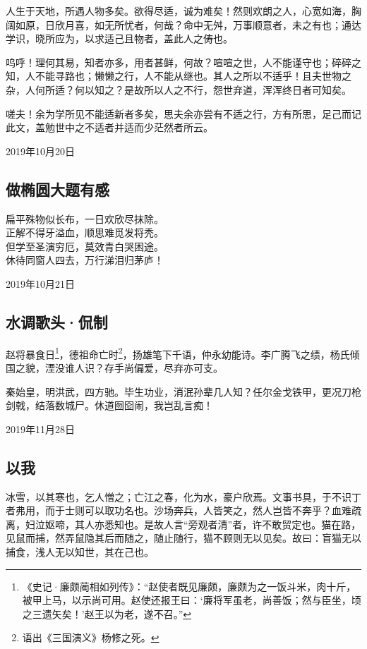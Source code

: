 \documentclass[a5paper]{ctexart}
\begin{document}
	人生于天地，所遇人物多矣。欲得尽适，诚为难矣！然则欢朗之人，心宽如海，胸阔如原，日欣月喜，如无所忧者，何哉？命中无舛，万事顺意者，未之有也；通达学识，晓所应为，以求适己且物者，盖此人之俦也。
	
	呜呼！理何其易，知者亦多，用者甚鲜，何故？喧喧之世，人不能谨守也；碎碎之知，人不能寻路也；懒懒之行，人不能从继也。其人之所以不适乎！且夫世物之杂，人何所适？何以知之？是故所以人之不行，怨世弃道，浑浑终日者可知矣。
	
	嗟夫！余为学所见不能适新者多矣，思夫余亦尝有不适之行，方有所思，足己而记此文，盖勉世中之不适者并适而少茫然者所云。
	\begin{flushright}
		2019年10月20日
	\end{flushright}
	
	\subsection{做椭圆大题有感}
	\begin{center}
		扁平殊物似长布，一日欢欣尽抹除。\\
		正解不得牙溢血，顺思难觅发将秃。\\
		但学至圣演穷厄，莫效青白哭困途。\\
		休待同窗人四去，万行涕泪归茅庐！
	\end{center}
	\begin{flushright}
			2019年10月21日
	\end{flushright}
	
	
	\subsection{水调歌头·侃制}
	赵将暴食日\footnote{《史记·廉颇蔺相如列传》：“赵使者既见廉颇，廉颇为之一饭斗米，肉十斤，被甲上马，以示尚可用。赵使还报王曰：‘廉将军虽老，尚善饭；然与臣坐，顷之三遗矢矣！’赵王以为老，遂不召。”}，德祖命亡时\footnote{语出《三国演义》杨修之死。}，扬雄笔下千语，仲永幼能诗。李广腾飞之绩，杨氏倾国之貌，湮没谁人识？存手尚偏爱，尽弃亦可支。
	
	秦始皇，明洪武，四方驰。毕生功业，消泯孙辈几人知？任尔金戈铁甲，更况刀枪剑戟，结落数城尸。休道囫囵闹，我岂乱言痴！
	\begin{flushright}
		2019年11月28日
	\end{flushright}
	
	\subsection{以我}
	冰雪，以其寒也，乞人憎之；亡江之春，化为水，豪户欣焉。文事书具，于不识丁者弗用，而于士则可以取功名也。沙场奔兵，人皆笑之，然人岂皆不奔乎？血难疏离，妇泣妪啼，其人亦悉知也。是故人言“旁观者清”者，许不敢贸定也。猫在路，见鼠而捕，然弄鼠隐其后而随之，随止随行，猫不顾则无以见矣。故曰：盲猫无以捕食，浅人无以知世，其在己也。
	
\end{document}
